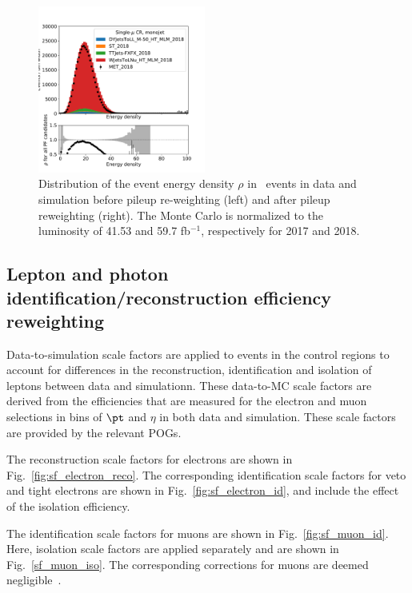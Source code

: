 \begin{figure}[ht!]
\begin{center}
    \includegraphics[width=0.49\textwidth]{fig/pileup/cr_1m_j_rho_all_2018.pdf}
    \caption{
        Distribution of the event energy density $\rho$  in \Wmn~events in data and
        simulation before pileup re-weighting (left) and after pileup reweighting (right).
        The Monte Carlo is normalized to the luminosity of 41.53 and 59.7 fb$^{-1}$, respectively for 2017 and 2018.
    }
    \label{fig:purwt_rho}
  \end{center}
\end{figure}

\subsection{Lepton and photon identification/reconstruction efficiency reweighting}

Data-to-simulation scale factors are applied to events in the control regions to
account for differences in the reconstruction, identification and isolation of leptons
between data and simulationn. These data-to-MC scale factors are derived from the efficiencies that are measured for the electron and muon
selections in bins of $\pt$ and $\eta$ in both data and simulation. These scale factors are
provided by the relevant POGs.


The reconstruction scale factors for electrons are shown in Fig.~\ref{fig:sf_electron_reco}. The corresponding identification scale factors for veto and tight electrons are shown in Fig.~\ref{fig:sf_electron_id}, and include the effect of the isolation efficiency. 

The identification scale factors for muons are shown in Fig.~\ref{fig:sf_muon_id}. Here, isolation scale factors are applied separately and are shown in Fig.~\ref{sf_muon_iso}. The corresponding corrections for muons are deemed negligible~\cite{CMS-MUO-TWIKI-SF}.

